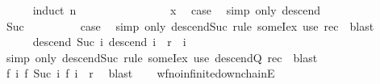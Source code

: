 \begin{isabellebody}
\ \ \ \ \isamarkupfalse%
\ {\isacharparenleft}{\kern0pt}induct\ n{\isacharparenright}{\kern0pt}\isanewline
\ \ \ \ \ \ \isamarkupfalse%
\ {}\isanewline
\ \ \ \ \ \ \isamarkupfalse%
\ x\ \isamarkupfalse%
\ {\isacharquery}{\kern0pt}case\ \isamarkupfalse%
\ {\isacharparenleft}{\kern0pt}simp\ only{\isacharcolon}{\kern0pt}\ descend{\isacharunderscore}{\kern0pt}{}{\isacharparenright}{\kern0pt}\isanewline
\ \ \ \ \isamarkupfalse%
\isanewline
\ \ \ \ \ \ \isamarkupfalse%
\ Suc\isanewline
\ \ \ \ \ \ \isamarkupfalse%
\ \isamarkupfalse%
\ {\isacharquery}{\kern0pt}case\ \isamarkupfalse%
\ {\isacharparenleft}{\kern0pt}simp\ only{\isacharcolon}{\kern0pt}\ descend{\isacharunderscore}{\kern0pt}Suc{\isacharparenright}{\kern0pt}\ {\isacharparenleft}{\kern0pt}rule\ someI{}{\isacharunderscore}{\kern0pt}ex{\isacharsemicolon}{\kern0pt}\ use\ rec\ \ blast{\isacharparenright}{\kern0pt}\isanewline
\ \ \ \ \isamarkupfalse%
\isanewline
\ \ \ \ \isamarkupfalse%
\ {\isachardoublequoteopen}{\isacharparenleft}{\kern0pt}descend\ {\isacharparenleft}{\kern0pt}Suc\ i{\isacharparenright}{\kern0pt}{\isacharcomma}{\kern0pt}\ descend\ i{\isacharparenright}{\kern0pt}\ {\isasymin}\ r{\isachardoublequoteclose}\ \ i\isanewline
\ \ \ \ \ \ \isamarkupfalse%
\ {\isacharparenleft}{\kern0pt}simp\ only{\isacharcolon}{\kern0pt}\ descend{\isacharunderscore}{\kern0pt}Suc{\isacharparenright}{\kern0pt}\ {\isacharparenleft}{\kern0pt}rule\ someI{}{\isacharunderscore}{\kern0pt}ex{\isacharsemicolon}{\kern0pt}\ use\ descend{\isacharunderscore}{\kern0pt}Q\ rec\ \ blast{\isacharparenright}{\kern0pt}\isanewline
\ \ \ \ \isamarkupfalse%
\ \isamarkupfalse%
\ {\isachardoublequoteopen}{\isasymexists}f{\isachardot}{\kern0pt}\ {\isasymforall}i{\isachardot}{\kern0pt}\ {\isacharparenleft}{\kern0pt}f\ {\isacharparenleft}{\kern0pt}Suc\ i{\isacharparenright}{\kern0pt}{\isacharcomma}{\kern0pt}\ f\ i{\isacharparenright}{\kern0pt}\ {\isasymin}\ r{\isachardoublequoteclose}\ \isamarkupfalse%
\ blast\isanewline
\ \ \isamarkupfalse%
\isanewline
{}\isamarkupfalse%
%
\endisatagproof
{\isafoldproof}%
%
\isadelimproof
\isanewline
%
\endisadelimproof
\isanewline
{}\isamarkupfalse%
\ wf{\isacharunderscore}{\kern0pt}no{\isacharunderscore}{\kern0pt}infinite{\isacharunderscore}{\kern0pt}down{\isacharunderscore}{\kern0pt}chainE{\isacharcolon}{\kern0pt}\isanewline

\end{isabellebody}
